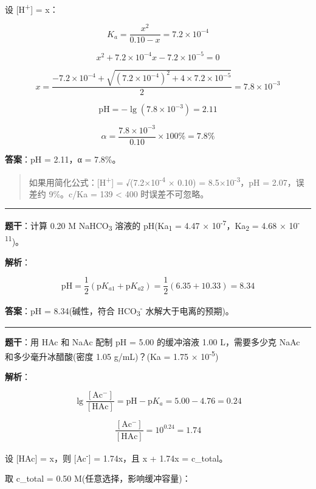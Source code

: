 \documentclass[a4paper,11pt]{ctexart}
\newcommand{\箭}{\ensuremath{\rightarrow}}
\newcommand{\左箭}{\ensuremath{\leftarrow}}
\newcommand{\上箭}{\ensuremath{\uparrow}}
\newcommand{\下箭}{\ensuremath{\downarrow}}
\newcommand{\衡}{\ensuremath{\rightleftharpoons}}
\newcommand{\双箭}{\ensuremath{\leftrightarrow}}
\newcommand{\约等于}{\ensuremath{\approx}}
\newcommand{\小于等于}{\ensuremath{\leq}}
\newcommand{\大于等于}{\ensuremath{\geq}}
\newcommand{\不等于}{\ensuremath{\neq}}
\newcommand{\西格马}{\ensuremath{\sigma}}
\newcommand{\派}{\ensuremath{\pi}}
\begin{document}
设 {[}H\textsuperscript{+}{]} = x：

\[K_a = \frac{x^2}{0.10 - x} = 7.2 \times 10^{-4}\]

\[x^2 + 7.2 \times 10^{-4} x - 7.2 \times 10^{-5} = 0\]

\[x = \frac{-7.2 \times 10^{-4} + \sqrt{(7.2 \times 10^{-4})^2 + 4 \times 7.2 \times 10^{-5}}}{2} = 7.8 \times 10^{-3}\]

\[\mathrm{pH} = -\lg(7.8 \times 10^{-3}) = 2.11\]

\[\alpha = \frac{7.8 \times 10^{-3}}{0.10} \times 100\% = 7.8\%\]

\textbf{答案}：pH = 2.11，α = 7.8\%。

\begin{quote}
如果用简化公式：{[}H\textsuperscript{+}{]} = √(7.2×10\textsuperscript{-4} × 0.10) = 8.5×10\textsuperscript{-3}，pH = 2.07，误差约 9\%。c/Ka = 139 \textless{} 400 时误差不可忽略。
\end{quote}

\begin{center}\rule{0.5\linewidth}{0.5pt}\end{center}

\textbf{题干}：计算 0.20 M NaHCO\textsubscript{3} 溶液的 pH(Ka\textsubscript{1} = 4.47 × 10\textsuperscript{-7}，Ka\textsubscript{2} = 4.68 × 10\textsuperscript{-11})。

\textbf{解析}：

\[\mathrm{pH} = \frac{1}{2}(\mathrm{p}K_{a1} + \mathrm{p}K_{a2}) = \frac{1}{2}(6.35 + 10.33) = 8.34\]

\textbf{答案}：pH = 8.34(碱性，符合 HCO\textsubscript{3}\textsuperscript{-} 水解大于电离的预期)。

\begin{center}\rule{0.5\linewidth}{0.5pt}\end{center}

\textbf{题干}：用 HAc 和 NaAc 配制 pH = 5.00 的缓冲溶液 1.00 L，需要多少克 NaAc 和多少毫升冰醋酸(密度 1.05 g/mL)？(Ka = 1.75 × 10\textsuperscript{-5})

\textbf{解析}：

\[\lg\frac{[\mathrm{Ac^-}]}{[\mathrm{HAc}]} = \mathrm{pH} - \mathrm{p}K_a = 5.00 - 4.76 = 0.24\]

\[\frac{[\mathrm{Ac^-}]}{[\mathrm{HAc}]} = 10^{0.24} = 1.74\]

设 {[}HAc{]} = x，则 {[}Ac\textsuperscript{-}{]} = 1.74x，且 x + 1.74x = c\_total。

取 c\_total = 0.50 M(任意选择，影响缓冲容量)：
\end{document}
